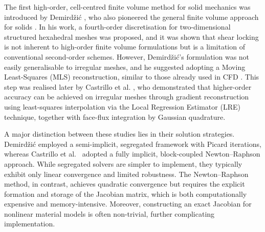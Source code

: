 \documentclass[review,3p]{elsarticle}
\begin{document}
The first high-order, cell-centred finite volume method for solid mechanics was introduced by Demirdžić \cite{Demirdzic2016}, who also pioneered the general finite volume approach for solids \cite{Demirdzic1988, Cardiff2021}. In his work, a fourth-order discretisation for two-dimensional structured hexahedral meshes was proposed, and it was shown that shear locking is not inherent to high-order finite volume formulations but is a limitation of conventional second-order schemes. However, Demirdžić’s formulation was not easily generalisable to irregular meshes, and he suggested adopting a Moving Least-Squares (MLS) reconstruction, similar to those already used in CFD \cite{Felgueroso2007, Ramirez2014, SaezMischlich2022}.
This step was realised later by Castrillo et al. \cite{Castrillo2022, Castrillo2023}, who demonstrated that higher-order accuracy can be achieved on irregular meshes through gradient reconstruction using least-squares interpolation via the Local Regression Estimator (LRE) technique, together with face-flux integration by Gaussian quadrature.

A major distinction between these studies lies in their solution strategies. Demirdžić \cite{Demirdzic2016} employed a semi-implicit, segregated framework with Picard iterations, whereas Castrillo et al.\ \cite{Castrillo2022,Castrillo2024} adopted a fully implicit, block-coupled Newton–Raphson approach. While segregated solvers are simpler to implement, they typically exhibit only linear convergence and limited robustness. The Newton–Raphson method, in contrast, achieves quadratic convergence but requires the explicit formation and storage of the Jacobian matrix, which is both computationally expensive and memory-intensive. Moreover, constructing an exact Jacobian for nonlinear material models is often non-trivial, further complicating implementation. 
\end{document}
